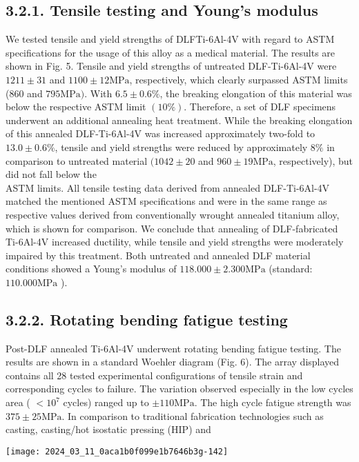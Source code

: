 \documentclass[10pt]{article}
\begin{document}
\subsection*{3.2.1. Tensile testing and Young's modulus}
We tested tensile and yield strengths of DLFTi-6Al-4V with regard to ASTM specifications for the usage of this alloy as a medical material. The results are shown in Fig. 5. Tensile and yield strengths of untreated DLF-Ti-6Al-4V were $1211 \pm 31$ and $1100 \pm 12 \mathrm{MPa}$, respectively, which clearly surpassed ASTM limits (860 and $795 \mathrm{MPa})$. With $6.5 \pm 0.6 \%$, the breaking elongation of this material was below the respective ASTM limit $(10 \%)$. Therefore, a set of DLF specimens underwent an additional annealing heat treatment. While the breaking elongation of this annealed DLF-Ti-6Al-4V was increased approximately two-fold to $13.0 \pm 0.6 \%$, tensile and yield strengths were reduced by approximately $8 \%$ in comparison to untreated material $(1042 \pm 20$ and $960 \pm 19 \mathrm{MPa}$, respectively), but did not fall below the\\
ASTM limits. All tensile testing data derived from annealed DLF-Ti-6Al-4V matched the mentioned ASTM specifications and were in the same range as respective values derived from conventionally wrought annealed titanium alloy, which is shown for comparison. We conclude that annealing of DLF-fabricated Ti-6Al-4V increased ductility, while tensile and yield strengths were moderately impaired by this treatment. Both untreated and annealed DLF material conditions showed a Young's modulus of $118.000 \pm 2.300 \mathrm{MPa}$ (standard: $110.000 \mathrm{MPa}$ ).

\subsection*{3.2.2. Rotating bending fatigue testing}
Post-DLF annealed Ti-6Al-4V underwent rotating bending fatigue testing. The results are shown in a standard Woehler diagram (Fig. 6). The array displayed contains all 28 tested experimental configurations of tensile strain and corresponding cycles to failure. The variation observed especially in the low cycles area ( $<10^{7}$ cycles) ranged up to $\pm 110 \mathrm{MPa}$. The high cycle fatigue strength was $375 \pm 25 \mathrm{MPa}$. In comparison to traditional fabrication technologies such as casting, casting/hot isostatic pressing (HIP) and

\begin{center}
\texttt{[image: 2024\_03\_11\_0aca1b0f099e1b7646b3g-142]}
\end{center}
\end{document}

